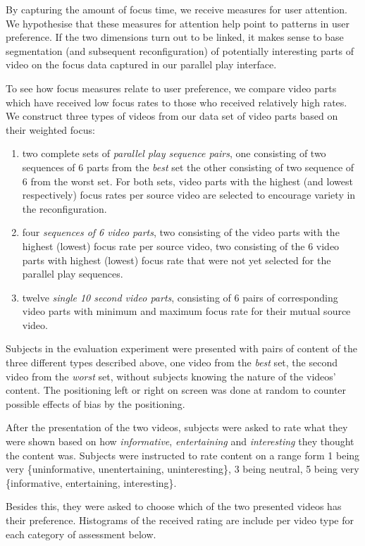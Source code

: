 By capturing the amount of focus time, we receive measures for user attention. We hypothesise that these measures for attention help point to patterns in user preference. If the two dimensions turn out to be linked, it makes sense to base segmentation (and subsequent reconfiguration) of potentially interesting parts of video on the focus data captured in our parallel play interface.

To see how focus measures relate to user preference, we compare video parts which have received low focus rates to those who received relatively high rates. We construct three types of videos from our data set of video parts based on their weighted focus:
\begin{enumerate}
  \item two complete sets of \emph{parallel play sequence pairs}, one consisting of two sequences of 6 parts from the \emph{best} set the other consisting of two sequence of 6 from the worst set. For both sets, video parts with the highest (and lowest respectively) focus rates per source video are selected to encourage variety in the reconfiguration.
  \item four \emph{sequences of 6 video parts}, two consisting of the video parts with the highest (lowest) focus rate per source video, two consisting of the 6 video parts with highest (lowest) focus rate that were not yet selected for the parallel play sequences.
  \item twelve \emph{single 10 second video parts}, consisting of 6 pairs of corresponding video parts with minimum and maximum focus rate for their mutual source video.
\end{enumerate}

Subjects in the evaluation experiment were presented with pairs of content of the three different types described above, one video from the \emph{best} set, the second video from the \emph{worst} set, without subjects knowing the nature of the videos' content. The positioning left or right on screen was done at random to counter possible effects of bias by the positioning. 

After the presentation of the two videos, subjects were asked to rate what they were shown based on how \emph{informative}, \emph{entertaining} and \emph{interesting} they thought the content was. Subjects were instructed to rate content on a range form 1 being very \{uninformative, unentertaining, uninteresting\}, 3 being neutral, 5 being very \{informative, entertaining, interesting\}.

Besides this, they were asked to choose which of the two presented videos has their preference. Histograms of the received rating are include per video type for each category of assessment below.


